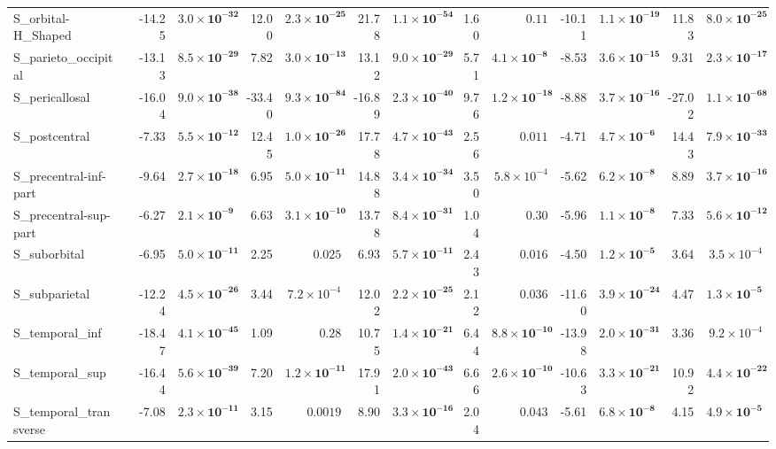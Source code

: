 {\begin{longtable}{llrrrrrrrrrrrr}
S\_orbital-H\_Shaped &  & -14.25 & $\mathbf{3.0{\times}10^{-32}}$ & 12.00 & $\mathbf{2.3{\times}10^{-25}}$ & 21.78 & $\mathbf{1.1{\times}10^{-54}}$ & 1.60 & $0.11$ & -10.11 & $\mathbf{1.1{\times}10^{-19}}$ & 11.83 & $\mathbf{8.0{\times}10^{-25}}$ \\
S\_parieto\_occipital &  & -13.13 & $\mathbf{8.5{\times}10^{-29}}$ & 7.82 & $\mathbf{3.0{\times}10^{-13}}$ & 13.12 & $\mathbf{9.0{\times}10^{-29}}$ & 5.71 & $\mathbf{4.1{\times}10^{-8}}$ & -8.53 & $\mathbf{3.6{\times}10^{-15}}$ & 9.31 & $\mathbf{2.3{\times}10^{-17}}$ \\
S\_pericallosal &  & -16.04 & $\mathbf{9.0{\times}10^{-38}}$ & -33.40 & $\mathbf{9.3{\times}10^{-84}}$ & -16.89 & $\mathbf{2.3{\times}10^{-40}}$ & 9.76 & $\mathbf{1.2{\times}10^{-18}}$ & -8.88 & $\mathbf{3.7{\times}10^{-16}}$ & -27.02 & $\mathbf{1.1{\times}10^{-68}}$ \\
S\_postcentral &  & -7.33 & $\mathbf{5.5{\times}10^{-12}}$ & 12.45 & $\mathbf{1.0{\times}10^{-26}}$ & 17.78 & $\mathbf{4.7{\times}10^{-43}}$ & 2.56 & $0.011$ & -4.71 & $\mathbf{4.7{\times}10^{-6}}$ & 14.43 & $\mathbf{7.9{\times}10^{-33}}$ \\
S\_precentral-inf-part &  & -9.64 & $\mathbf{2.7{\times}10^{-18}}$ & 6.95 & $\mathbf{5.0{\times}10^{-11}}$ & 14.88 & $\mathbf{3.4{\times}10^{-34}}$ & 3.50 & $5.8{\times}10^{-4}$ & -5.62 & $\mathbf{6.2{\times}10^{-8}}$ & 8.89 & $\mathbf{3.7{\times}10^{-16}}$ \\
S\_precentral-sup-part &  & -6.27 & $\mathbf{2.1{\times}10^{-9}}$ & 6.63 & $\mathbf{3.1{\times}10^{-10}}$ & 13.78 & $\mathbf{8.4{\times}10^{-31}}$ & 1.04 & $0.30$ & -5.96 & $\mathbf{1.1{\times}10^{-8}}$ & 7.33 & $\mathbf{5.6{\times}10^{-12}}$ \\
S\_suborbital &  & -6.95 & $\mathbf{5.0{\times}10^{-11}}$ & 2.25 & $0.025$ & 6.93 & $\mathbf{5.7{\times}10^{-11}}$ & 2.43 & $0.016$ & -4.50 & $\mathbf{1.2{\times}10^{-5}}$ & 3.64 & $3.5{\times}10^{-4}$ \\
S\_subparietal &  & -12.24 & $\mathbf{4.5{\times}10^{-26}}$ & 3.44 & $7.2{\times}10^{-4}$ & 12.02 & $\mathbf{2.2{\times}10^{-25}}$ & 2.12 & $0.036$ & -11.60 & $\mathbf{3.9{\times}10^{-24}}$ & 4.47 & $\mathbf{1.3{\times}10^{-5}}$ \\
S\_temporal\_inf &  & -18.47 & $\mathbf{4.1{\times}10^{-45}}$ & 1.09 & $0.28$ & 10.75 & $\mathbf{1.4{\times}10^{-21}}$ & 6.44 & $\mathbf{8.8{\times}10^{-10}}$ & -13.98 & $\mathbf{2.0{\times}10^{-31}}$ & 3.36 & $9.2{\times}10^{-4}$ \\
S\_temporal\_sup &  & -16.44 & $\mathbf{5.6{\times}10^{-39}}$ & 7.20 & $\mathbf{1.2{\times}10^{-11}}$ & 17.91 & $\mathbf{2.0{\times}10^{-43}}$ & 6.66 & $\mathbf{2.6{\times}10^{-10}}$ & -10.63 & $\mathbf{3.3{\times}10^{-21}}$ & 10.92 & $\mathbf{4.4{\times}10^{-22}}$ \\
S\_temporal\_transverse &  & -7.08 & $\mathbf{2.3{\times}10^{-11}}$ & 3.15 & $0.0019$ & 8.90 & $\mathbf{3.3{\times}10^{-16}}$ & 2.04 & $0.043$ & -5.61 & $\mathbf{6.8{\times}10^{-8}}$ & 4.15 & $\mathbf{4.9{\times}10^{-5}}$ \\
\end{longtable}}
